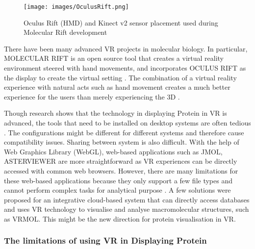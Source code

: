\begin{figure}[!htp]
	\centering
	\texttt{[image: images/OculusRift.png]}
	\caption{Oculus Rift (HMD) and Kinect v2 sensor placement used during Molecular Rift development}
	\label{fig:OculusRift}
\end{figure}


There have been many advanced VR projects in molecular biology. In particular,  {\footnotesize MOLECULAR RIFT} is an open source tool that creates a virtual reality environment steered with hand movements, and incorporates {\footnotesize OCULUS RIFT} as the display to create the virtual setting \parencite{norrby_molecular_2015}. The combination of a virtual reality experience with natural acts such as hand movement creates a much better experience for the users than merely experiencing the 3D \parencite{norrby_molecular_2015}.

Though research shows that the technology in displaying Protein in VR is advanced, the tools that need to be installed on desktop systems are often tedious \parencite{xu_vrmol_2019}.  The configurations might be different for different systems and therefore cause compatibility issues. Sharing between system is also difficult. With the help of Web Graphics Library (WebGL), web-based applications such as {\footnotesize JMOL}, {\footnotesize ASTERVIEWER} are more straightforward as VR experiences can be directly accessed with common web browsers. However, there are many limitations for these web-based applications because they only support a few file types and cannot perform complex tasks for analytical purpose \parencite{xu_vrmol_2019}. A few solutions were proposed for an integrative cloud-based system that can directly access databases and uses VR technology to visualise and analyse macromolecular structures, such as {\footnotesize VRMOL}. This might be the new direction for protein visualisation in VR.

\subsubsection{The limitations of using VR in Displaying Protein}

